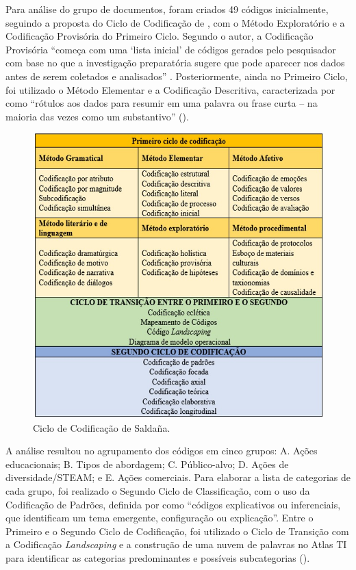 \documentclass[portuguese]{textolivre}
\begin{document}
Para análise do grupo de documentos, foram criados 49 códigos inicialmente, seguindo a proposta do Ciclo de Codificação de \textcite{saldana_coding_2013}, com o Método Exploratório e a Codificação Provisória do Primeiro Ciclo. Segundo o autor, a Codificação Provisória ``começa com uma ‘lista inicial’ de códigos gerados pelo pesquisador com base no que a investigação preparatória sugere que pode aparecer nos dados antes de serem coletados e analisados'' \cite[p.100]{saldana_coding_2013}. Posteriormente, ainda no Primeiro Ciclo, foi utilizado o Método Elementar e a Codificação Descritiva, caracterizada por \textcite[p.~158]{saldana_coding_2013} como ``rótulos aos dados para resumir em uma palavra ou frase curta – na maioria das vezes como um substantivo'' ().

\begin{figure}[!htbp]
\centering
\begin{minipage}{0.8\textwidth}
\includegraphics[width=\linewidth]{Fig1.png}
\caption{Ciclo de Codificação de Saldaña.}
\label{fig1}
\end{minipage}
\end{figure}

A análise resultou no agrupamento dos códigos em cinco grupos: A. Ações educacionais; B. Tipos de abordagem; C. Público-alvo; D. Ações de diversidade/STEAM; e E. Ações comerciais. Para elaborar a lista de categorias de cada grupo, foi realizado o Segundo Ciclo de Classificação, com o uso da Codificação de Padrões, definida por \textcite[p.~233]{saldana_coding_2013} como ``códigos explicativos ou inferenciais, que identificam um tema emergente, configuração ou explicação''. Entre o Primeiro e o Segundo Ciclo de Codificação, foi utilizado o Ciclo de Transição com a Codificação \textit{Landscaping} e a construção de uma nuvem de palavras no Atlas TI para identificar as categorias predominantes e possíveis subcategorias ().
\end{document}
